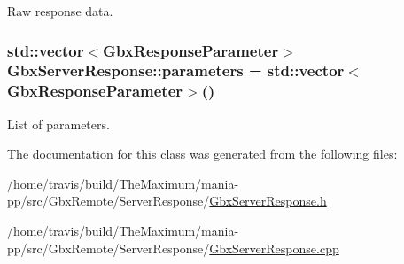 Raw response data. 

\hypertarget{classGbxServerResponse_acfd80e7b92cf34e1f0cda88a11a1bed0}{
\subsubsection[{parameters}]{\setlength{\rightskip}{0pt plus 5cm}std\-::vector$<${\bf Gbx\-Response\-Parameter}$>$ Gbx\-Server\-Response\-::parameters = std\-::vector$<${\bf Gbx\-Response\-Parameter}$>$()\hspace{0.3cm}{\ttfamily [protected]}}}\label{classGbxServerResponse_acfd80e7b92cf34e1f0cda88a11a1bed0}


List of parameters. 



The documentation for this class was generated from the following files\-:\begin{DoxyCompactItemize}
\item 
/home/travis/build/\-The\-Maximum/mania-\/pp/src/\-Gbx\-Remote/\-Server\-Response/\hyperlink{GbxServerResponse_8h}{Gbx\-Server\-Response.\-h}\item 
/home/travis/build/\-The\-Maximum/mania-\/pp/src/\-Gbx\-Remote/\-Server\-Response/\hyperlink{GbxServerResponse_8cpp}{Gbx\-Server\-Response.\-cpp}\end{DoxyCompactItemize}
